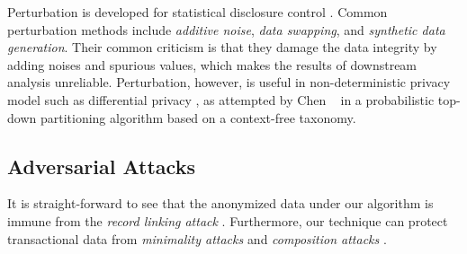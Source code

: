 Perturbation is developed for statistical disclosure control
\cite{FungWCY10:Survey}. Common perturbation methods include {\em additive
noise}, {\em data swapping}, and {\em synthetic data generation}. Their
common criticism is that they damage the data integrity by adding noises and
spurious values, which makes the results of downstream analysis unreliable.
Perturbation, however, is useful in non-deterministic privacy model such as
differential privacy \cite{Dwork08:diff:survey}, as
attempted by Chen \etal~ \cite{ChenMFDX11:Diff} in a probabilistic top-down
partitioning algorithm based on a context-free taxonomy.
%

\subsection{Adversarial Attacks}
It is straight-forward to see that the anonymized data under our algorithm
is immune from the {\em record linking attack} \cite{FungWCY10:Survey}.
Furthermore, our technique can protect transactional data from {\em minimality
attacks} \cite{Wong:2007:Minimality} and {\em composition attacks} \cite{Ganta:2008:Composition}.


